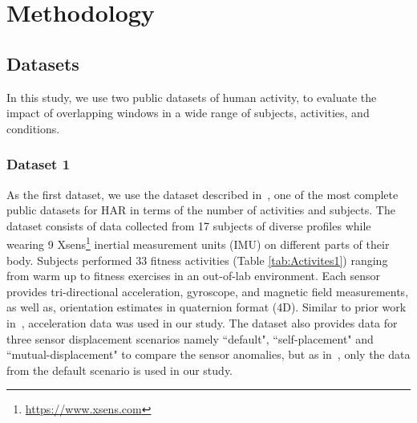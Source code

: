 \chapter{Methodology}\label{chap:method}
\section{Datasets} \label{sec:dataset}
In this study, we use two public datasets of human activity, to evaluate the impact of overlapping windows in a wide range of subjects, activities, and conditions. 

\subsection{Dataset 1} \label{sec:dataset1}
 As the first dataset, we use the dataset described in~\cite{banos2012benchmark}, one of the most complete public datasets for HAR in terms of the number of activities and subjects. The dataset consists of data collected from 17 subjects of diverse profiles while wearing 9 Xsens\footnote{\url{https://www.xsens.com}} inertial measurement units (IMU) on different parts of their body. Subjects performed 33 fitness activities (Table \ref{tab:Activites1}) ranging from warm up to fitness exercises in an out-of-lab environment. Each sensor provides tri-directional acceleration, gyroscope, and magnetic field measurements, as well as, orientation estimates in quaternion format (4D). Similar to prior work in~\cite{banos2014window}, acceleration data was used in our study. The dataset also provides data for three sensor displacement scenarios namely ``default", ``self-placement" and ``mutual-displacement" to compare the sensor anomalies, but as in~\cite{banos2014window}, only the data from the default scenario is used in our study. 

